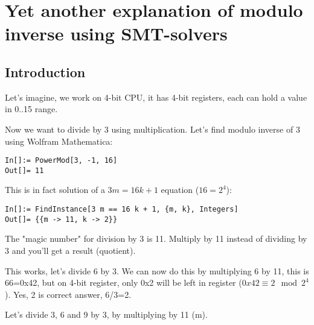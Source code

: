 \section{Yet another explanation of modulo inverse using SMT-solvers}

\subsection{Introduction}

Let's imagine, we work on 4-bit CPU, it has 4-bit registers, each can hold a value in 0..15 range.

Now we want to divide by 3 using multiplication.
Let's find modulo inverse of 3 using Wolfram Mathematica:

\begin{lstlisting}
In[]:= PowerMod[3, -1, 16]
Out[]= 11
\end{lstlisting}

This is in fact solution of a $3m=16k+1$ equation ($16 = 2^4$):

\begin{lstlisting}
In[]:= FindInstance[3 m == 16 k + 1, {m, k}, Integers]
Out[]= {{m -> 11, k -> 2}}
\end{lstlisting}

The "magic number" for division by 3 is 11. Multiply by 11 instead of dividing by 3 and you'll get a result (quotient).

This works, let's divide 6 by 3. We can now do this by multiplying 6 by 11, this is 66=0x42, but on 4-bit register, only 0x2 will be left in register ($0x42 \equiv 2 \mod 2^4$).
Yes, 2 is correct answer, 6/3=2.

Let's divide 3, 6 and 9 by 3, by multiplying by 11 (m).

\iffalse
\begin{lstlisting}[basicstyle=\tiny]
           |123456789abcdef0|123456789abcdef0|123456789abcdef0|123456789abcdef0|123456789abcdef0|123456789abcdef0|123456789abcdef0|
    m=11   |***********     |                |                |                |                |                |                |
3/3 3m=33  |****************|****************|*               |                |                |                |                |
6/3 6m=66  |****************|****************|****************|****************|**              |                |                |
9/3 9m=99  |****************|****************|****************|****************|****************|****************|***             |
\end{lstlisting}
\fi

